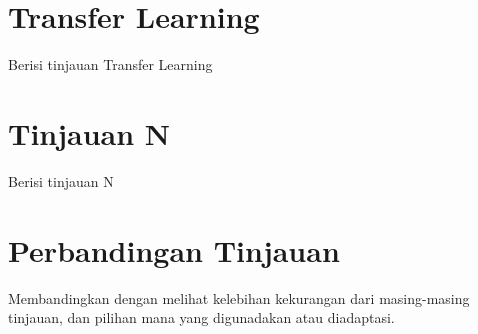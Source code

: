 \section{Transfer Learning\label{sec:2-TransferLearning}}
Berisi tinjauan Transfer Learning

\section{Tinjauan N \label{sec:2-TinjauanN}}
Berisi tinjauan N

\section{Perbandingan Tinjauan \label{sec2-Banding}}
Membandingkan dengan melihat kelebihan kekurangan dari masing-masing tinjauan, dan pilihan mana 
yang digunadakan atau diadaptasi.
